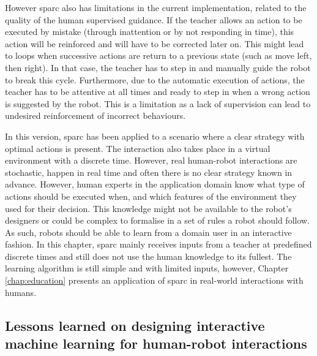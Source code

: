 However \gls{sparc} also has limitations in the current implementation, related to the quality of the human supervised guidance. If the teacher allows an action to be executed by mistake (through inattention or by not responding in time), this action will be reinforced and will have to be corrected later on. This might lead to loops when successive actions are return to a previous state (such as move left, then right). In that case, the teacher has to step in and manually guide the robot to break this cycle. Furthermore, due to the automatic execution of actions, the teacher has to be attentive at all times and ready to step in when a wrong action is suggested by the robot. This is a limitation as a lack of supervision can lead to undesired reinforcement of incorrect behaviours.

In this version, \gls{sparc} has been applied to a scenario where a clear strategy with optimal actions is present. The interaction also takes place in a virtual environment with a discrete time. However, real human-robot interactions are stochastic, happen in real time and often there is no clear strategy known in advance. However, human experts in the application domain know what type of actions should be executed when, and which features of the environment they used for their decision. This knowledge might not be available to the robot's designers or could be complex to formalise in a set of rules a robot should follow. As such, robots should be able to learn from a domain user in an interactive fashion. In this chapter, \gls{sparc} mainly receives inputs from a teacher at predefined discrete times and still does not use the human knowledge to its fullest. The learning algorithm is still simple and with limited inputs, however, Chapter \ref{chap:education} presents an application of \gls{sparc} in real-world interactions with humans.


\subsection{Lessons learned on designing interactive machine learning for human-robot interactions}

